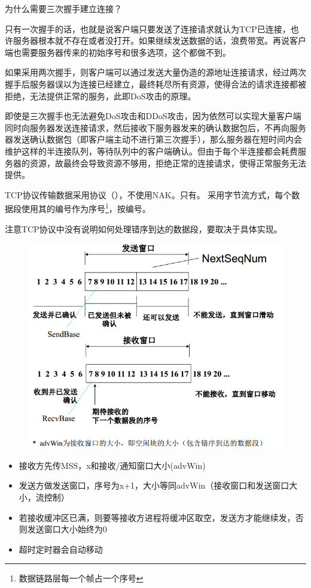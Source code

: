 \begin{example}
    为什么需要三次握手建立连接？
\end{example}
\begin{analysis}
    只有一次握手的话，也就是说客户端只要发送了连接请求就认为TCP已连接，也许服务器根本就不存在或者没打开。如果继续发送数据的话，浪费带宽。再说客户端也需要服务器传来的初始序号和很多选项，这个都做不到。

    如果采用两次握手，则客户端可以通过发送大量伪造的源地址连接请求，经过两次握手后服务器误以为连接已经建立，最终耗尽所有资源，使得合法的请求连接都被拒绝，无法提供正常的服务，此即DoS攻击的原理。

    即使是三次握手也无法避免DoS攻击和DDoS攻击，因为依然可以实现大量客户端同时向服务器发送连接请求，然后接收下服务器发来的确认数据包后，不再向服务器发送确认数据包（即客户端主动不进行第三次握手），那么服务器在短时间内会维护这样的半连接队列，等待队列中的客户端确认。但由于每个半连接都会耗费服务器的资源，故最终会导致资源不够用，拒绝正常的连接请求，使得正常服务无法提供。
\end{analysis}

\myhline
TCP协议传输数据采用协议（），不使用NAK。只有。
采用字节流方式，每个数据段使用其的编号作为序号\footnote{数据链路层每一个帧占一个序号}，按编号。

注意TCP协议中没有说明如何处理错序到达的数据段，要取决于具体实现。

\begin{figure}[H]
    \centering
    \includegraphics[width=0.6\linewidth]{fig/TCP-window.PNG}
\end{figure}
\begin{itemize}
\item 接收方先传MSS，x和接收/通知窗口大小(advWin)
\item 发送方做发送窗口，序号为x+1，大小等同advWin（接收窗口和发送窗口大小，流控制）
\item 若接收缓冲区已满，则要等接收方进程将缓冲区取空，发送方才能继续发，否则发送窗口大小始终为0
\item 超时定时器会自动移动
\end{itemize}

